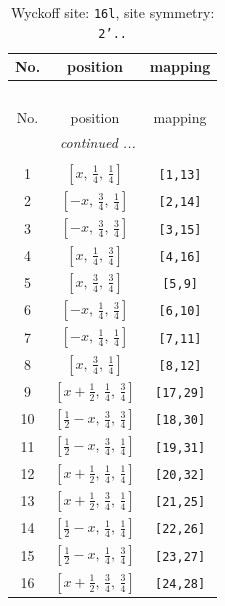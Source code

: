 \documentclass[fleqn,8pt]{jsarticle}
\begin{document}
\renewcommand{\arraystretch}{1.2}
\begin{longtable}{ccc}
\caption{Wyckoff site: {\tt 16l}, site symmetry: {\tt 2'..}}
 \\
 \hline \hline
No. & position & mapping \\ \hline \endfirsthead

\multicolumn{2}{l}{\tablename\ \thetable{}} \\
 \hline \hline
No. & position & mapping \\ \hline \endhead

 \hline \hline
\multicolumn{2}{r}{\footnotesize\it continued ...} \\ \endfoot

 \hline \hline
\multicolumn{2}{r}{} \\ \endlastfoot

1 & $\left[ x,\, \frac{1}{4},\, \frac{1}{4} \right]$ & {\tt [1,13]} \\ \hline
2 & $\left[ - x,\, \frac{3}{4},\, \frac{1}{4} \right]$ & {\tt [2,14]} \\ \hline
3 & $\left[ - x,\, \frac{3}{4},\, \frac{3}{4} \right]$ & {\tt [3,15]} \\ \hline
4 & $\left[ x,\, \frac{1}{4},\, \frac{3}{4} \right]$ & {\tt [4,16]} \\ \hline
5 & $\left[ x,\, \frac{3}{4},\, \frac{3}{4} \right]$ & {\tt [5,9]} \\ \hline
6 & $\left[ - x,\, \frac{1}{4},\, \frac{3}{4} \right]$ & {\tt [6,10]} \\ \hline
7 & $\left[ - x,\, \frac{1}{4},\, \frac{1}{4} \right]$ & {\tt [7,11]} \\ \hline
8 & $\left[ x,\, \frac{3}{4},\, \frac{1}{4} \right]$ & {\tt [8,12]} \\ \hline
9 & $\left[ x + \frac{1}{2},\, \frac{1}{4},\, \frac{3}{4} \right]$ & {\tt [17,29]} \\ \hline
10 & $\left[ \frac{1}{2} - x,\, \frac{3}{4},\, \frac{3}{4} \right]$ & {\tt [18,30]} \\ \hline
11 & $\left[ \frac{1}{2} - x,\, \frac{3}{4},\, \frac{1}{4} \right]$ & {\tt [19,31]} \\ \hline
12 & $\left[ x + \frac{1}{2},\, \frac{1}{4},\, \frac{1}{4} \right]$ & {\tt [20,32]} \\ \hline
13 & $\left[ x + \frac{1}{2},\, \frac{3}{4},\, \frac{1}{4} \right]$ & {\tt [21,25]} \\ \hline
14 & $\left[ \frac{1}{2} - x,\, \frac{1}{4},\, \frac{1}{4} \right]$ & {\tt [22,26]} \\ \hline
15 & $\left[ \frac{1}{2} - x,\, \frac{1}{4},\, \frac{3}{4} \right]$ & {\tt [23,27]} \\ \hline
16 & $\left[ x + \frac{1}{2},\, \frac{3}{4},\, \frac{3}{4} \right]$ & {\tt [24,28]} \\
\end{longtable}
\end{document}
